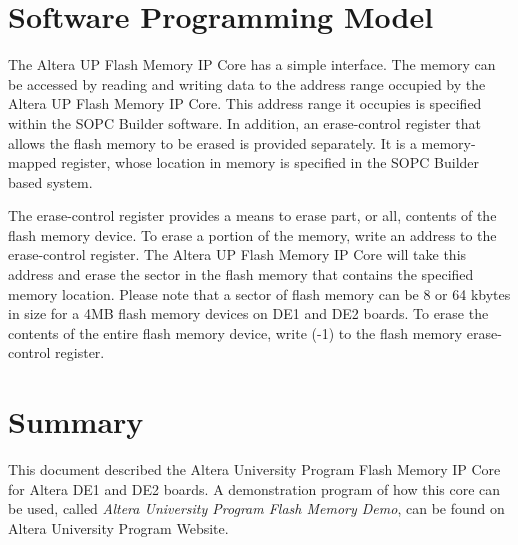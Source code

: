 
\section{Software Programming Model}

The Altera UP Flash Memory IP Core has a simple interface. The memory can be accessed by reading and writing data to the
address range occupied by the Altera UP Flash Memory IP Core. This address range it occupies is specified within the SOPC
Builder software. In addition, an erase-control register that allows the flash memory to be erased is provided separately. It is
a memory-mapped register, whose location in memory is specified in the SOPC Builder based system.

The erase-control register provides a means to erase part, or all, contents of the flash memory device. To erase a portion
of the memory, write an address to the erase-control register. The Altera UP Flash Memory IP Core will take this address and
erase the sector in the flash memory that contains the specified memory location. Please note that a sector of flash memory
can be 8 or 64 kbytes in size for a 4MB flash memory devices on DE1 and DE2 boards. To erase the contents of the entire flash
memory device, write (-1) to the flash memory erase-control register.

\section{Summary}

This document described the Altera University Program Flash Memory IP Core for Altera DE1 and DE2 boards. A demonstration program
of how this core can be used, called \textit{Altera University Program Flash Memory Demo}, can be found on Altera University Program Website.								


